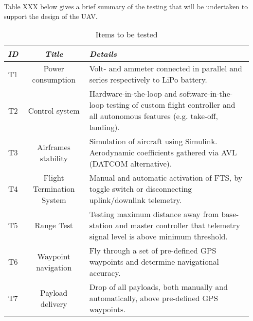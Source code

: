 Table XXX below gives a brief summary of the testing that will be undertaken to support the design of the UAV.

\begin{table}[h]
 \centering
 \begin{tabular}{||c | c | p{70mm}||} 
 \hline
 \textit{ID} & \textit{Title} & \textit{Details} \\ [0.5ex] 
 \hline\hline
 T1 & Power consumption & Volt- and ammeter connected in parallel and series respectively to LiPo battery. \\
 \hline
 T2 & Control system & Hardware-in-the-loop and software-in-the-loop testing of custom flight controller and all autonomous features (e.g. take-off, landing). \\
 \hline
 T3 & Airframes stability & Simulation of aircraft using Simulink. Aerodynamic coefficients gathered via AVL (DATCOM alternative). \\
 \hline
 T4 & Flight Termination System & Manual and automatic activation of FTS, by toggle switch or disconnecting uplink/downlink telemetry. \\
 \hline
 T5 & Range Test & Testing maximum distance away from base-station and master controller that telemetry signal level is above minimum threshold. \\
 \hline
 T6 & Waypoint navigation & Fly through a set of pre-defined GPS waypoints and determine navigational accuracy. \\
 \hline
 T7 & Payload delivery & Drop of all payloads, both manually and automatically, above pre-defined GPS waypoints. \\
 \hline
\end{tabular}
\caption{Items to be tested}
\end{table}
